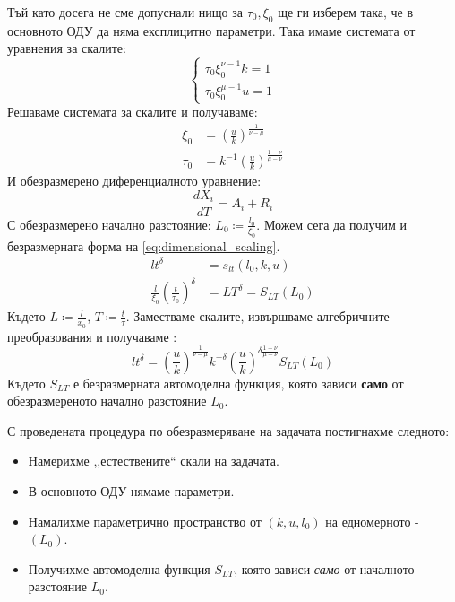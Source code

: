 Тъй като досега не сме допуснали нищо за $\tau_0, \xi_0$ ще ги изберем така, че в основното ОДУ да няма експлицитно параметри. Така имаме системата от уравнения за скалите:
\begin{equation}
    \begin{cases}
        \tau_0 \xi_0^{\nu-1} k = 1 \\
         \tau_0 \xi_0^{\mu-1} u = 1
    \end{cases} 
\end{equation}
Решаваме системата за скалите и получаваме:
\begin{align*}
    \xi_0 &= \left( \frac{u}{k} \right)^ {\frac{1}{\nu - \mu}} \\
    \tau_0 &= k^{-1} \left( \frac{u}{k} \right) ^ {\frac{1-\nu}{\mu - \nu}}
\end{align*}
И обезразмерено диференциалното уравнение:
\begin{equation}
    \label{eq:non_dimenisonal_ode}
    \frac{d X_i}{d T} = A_i + R_i
\end{equation}
С обезразмерено начално разстояние: $L_0 \coloneqq \frac{l_0}{\xi_0}$.
Можем сега да получим и безразмерната форма на \autoref{eq:dimensional_scaling}.
\begin{align*}
    l t^\delta &= s_{l t}(l_0, k, u) \\
    \frac{l}{\xi_0} \left(\frac{t}{\tau_0}\right)^{\delta} &= L T ^\delta = S_{L T} (L_0)
\end{align*}
Където $L \coloneqq \frac{l}{x_0}$, $T \coloneqq \frac{t}{\tau}$. Заместваме скалите, извършваме алгебричните преобразования и получаваме \cite{Krasteva2016}:
\begin{equation*}
    l t ^ \delta =  \left( \frac{u}{k} \right)^ {\frac{1}{\nu - \mu}} k^{-\delta} \left( \frac{u}{k} \right) ^ {\delta \frac{1-\nu}{\mu - \nu}} S_{L T} (L_0)
\end{equation*}
Където $S_{L T}$ е безразмерната автомоделна функция, която зависи \textbf{само} от обезразмереното начално разстояние $L_0$.

С проведената процедура по обезразмеряване на задачата постигнахме следното:
\begin{itemize}
    \item Намерихме ,,естествените`` скали на задачата.
    \item В основното ОДУ нямаме параметри.
    \item Намалихме параметрично пространство от $(k, u, l_0)$ на едномерното - $(L_0)$.
    \item Получихме автомоделна функция $S_{L T}$, която зависи \textit{само} от началното разстояние $L_0$.
\end{itemize}

